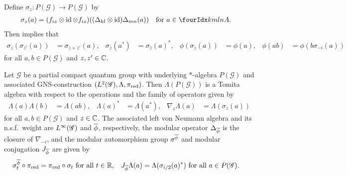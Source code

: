 Define $\sigma_{z} \colon P(\mathscr{G}) \to P(\mathscr{G})$
by
\begin{align*}
\sigma_{z}(a) &= (f_{iz} \otimes \id \otimes f_{iz})((\Delta_{kl}
\otimes \id)\Delta_{mn}(a)) \quad \text{for } a\in \Gr{A}{k}{l}{m}{n}.
\end{align*}
Then \cite[Theorem 2.25]{DCT1} implies that
\begin{align} \label{eq:alg-mod-aut}
 \sigma_{z}(\sigma_{z'}(a)) &= \sigma_{z+z'}(a), &
 \sigma_{z}(a^{*}) &= \sigma_{\overline{z}}(a)^{*}, &
\phi(\sigma_{z}(a)) &= \phi(a), & \phi(ab) &= \phi(b\sigma_{-i}(a))
\end{align}
for all $a,b\in P(\mathscr{G})$ and $z,z'\in \mathbb{C}$. 
\begin{Prop} \label{prop:tomita}
  Let $\mathscr{G}$ be a partial compact quantum group with underlying
  $*$-algebra $P(\mathscr{G})$ and associated GNS-construction
  $(L^{2}(\mathscr{G}),\Lambda,\pi_{\operatorname{\mathrm{red}}})$. Then 
  $\Lambda(P(\mathscr{G}))$ is a Tomita algebra with
  respect to the operations and the family of operators given by
  \begin{align*}
    \Lambda(a)\Lambda(b)&=\Lambda(ab), & \Lambda(a)^{*}&=
  \Lambda(a^{*}), &
\nabla_{z}\Lambda(a)&=\Lambda(\sigma_{z}(a))
  \end{align*}
  for all $a,b\in P(\mathscr{G})$ and $z\in \mathbb{C}$.  The associated left
  von Neumann algebra and its n.s.f.\ weight are $L^{\infty}(\mathscr{G})$ and
  $\overline{\phi}$, respectively, the modular operator $\Delta_{\overline{\phi}}$ is
  the closure of $\nabla_{-i}$, and the   modular automorphism group $\sigma^{\overline{\phi}}$
  and modular conjugation $J_{\overline{\phi}}$ are given by
  \begin{align*}
    \sigma^{\overline{\phi}}_{t} \circ \pi_{\operatorname{\mathrm{red}}} &= \pi_{\operatorname{\mathrm{red}}} \circ \sigma_{t}
    \text{ for all } t\in \mathbb{R}, & J_{\overline{\phi}}
    \Lambda(a)&=\Lambda(\sigma_{i/2}(a)^{*}) \text{ for all } a\in
    P(\mathscr{G}).
  \end{align*}
\end{Prop}

